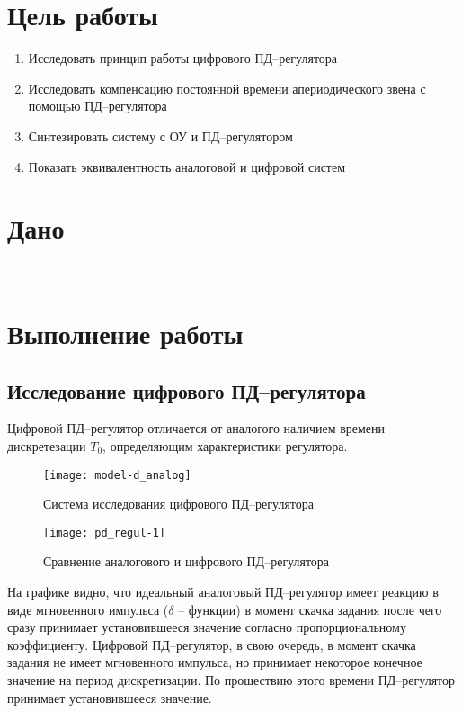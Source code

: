 


    
    \setcounter{page}{2}

    \section{Цель работы}
        \begin{enumerate}
            \item Исследовать принцип работы цифрового ПД--регулятора
            \item Исследовать компенсацию постоянной времени апериодического звена с помощью ПД--регулятора
            \item Синтезировать систему с ОУ и ПД--регулятором
            \item Показать эквивалентность аналоговой и цифровой систем
        \end{enumerate}

    \section{Дано}
        \begin{center}
            \noindent{}\\
        \end{center}

    \section{Выполнение работы}
        \subsection{Исследование цифрового ПД--регулятора}
            Цифровой ПД--регулятор отличается от аналогого наличием времени дискретезации $T_0$,
            определяющим характеристики регулятора.
            \begin{figure}[H]
                \centering\texttt{[image: model-d\_analog]}
                \caption{Система исследования цифрового ПД--регулятора}
            \end{figure}
            \begin{figure}[H]
                \centering\texttt{[image: pd\_regul-1]}
                \caption{Сравнение аналогового и цифрового ПД--регулятора}
                
            \end{figure}
            На графике видно, что идеальный аналоговый ПД--регулятор имеет реакцию в виде мгновенного импульса ($ \delta $ -- функции) в момент скачка задания после чего сразу принимает установившееся значение согласно пропорциональному коэффициенту.
            Цифровой ПД--регулятор, в свою очередь, в момент скачка задания не имеет мгновенного импульса, но принимает некоторое конечное значение на период дискретизации. По прошествию этого времени ПД--регулятор принимает установившееся значение.
        
